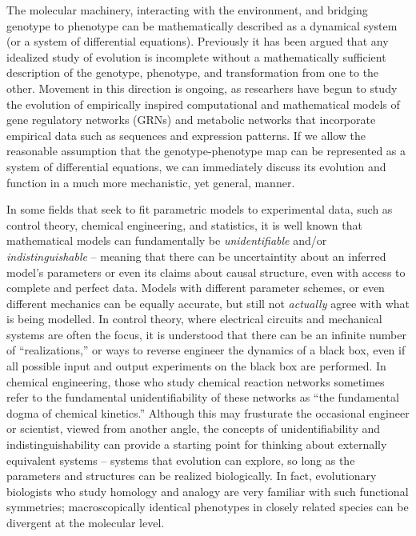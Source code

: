 \documentclass[11 pt]{article}
\begin{document}
The molecular machinery, interacting with the environment, and bridging genotype to phenotype
can be mathematically described as a dynamical system (or a system of differential equations).
Previously it has been argued that any idealized study of evolution is incomplete without
a mathematically sufficient description of the genotype, phenotype, and transformation from
one to the other. Movement in this direction is ongoing, as researhers have begun to study 
the evolution of empirically inspired computational and mathematical models of gene regulatory networks (GRNs) and metabolic networks that incorporate empirical data such as sequences and expression patterns. If we allow the reasonable assumption that the genotype-phenotype map can be represented as a system of differential equations, we can immediately discuss its evolution and function in a much more mechanistic, yet general, manner. 

In some fields that seek to fit parametric models to experimental data, such as control
theory, chemical engineering, and statistics, it is well known that mathematical models
can fundamentally be \emph{unidentifiable} and/or \emph{indistinguishable} -- meaning that 
there can be uncertaintity about an inferred model's parameters or even its claims about
causal structure, even with access to complete and perfect data. Models with different 
parameter schemes, or even different mechanics can be equally accurate, but still not
\emph{actually} agree with what is being modelled. In control theory, where electrical 
circuits and mechanical systems are often the focus, it is understood that there can be an 
infinite number of ``realizations,'' or ways to reverse engineer the dynamics of a black box,
even if all possible input and output experiments on the black box are performed. In chemical
engineering, those who study chemical reaction networks sometimes refer to the fundamental
unidentifiability of these networks as ``the fundamental dogma of chemical kinetics.''
Although this may frusturate the occasional engineer or scientist, viewed from another angle,
the concepts of unidentifiability and indistinguishability can provide a starting point for
thinking about externally equivalent systems -- systems that evolution can explore, so long
as the parameters and structures can be realized biologically. In fact, evolutionary
biologists who study homology and analogy are very familiar with such functional symmetries; macroscopically identical phenotypes in closely related species can be divergent at the molecular level.  
\end{document}
